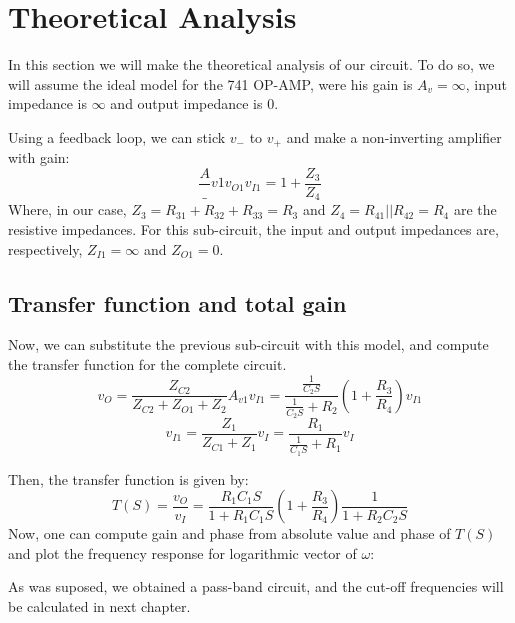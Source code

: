 \section{Theoretical Analysis}
\label{sec:analysis}

\par In this section we will make the theoretical analysis of our circuit. To do so, we will assume the ideal model for the 741 OP-AMP, were his gain is $A_v=\infty$, input impedance is $\infty$ and output impedance is $0$.

\par Using a feedback loop, we can stick $v_-$ to $v_+$ and make a non-inverting amplifier with gain: 
\begin{equation}
\frac A_{v1}{v_{O1}}{v_{I1}}=1+\frac{Z_3}{Z_4}
\end{equation}
Where, in our case, $Z_3=R_{31}+R_{32}+R_{33}=R_3$ and $Z_4=R_{41}||R_{42}=R_4$ are the resistive impedances. For this sub-circuit, the input and output impedances are, respectively, $Z_{I1}=\infty$ and $Z_{O1}=0$. 

\subsection{Transfer function and total gain}

\par Now, we can substitute the previous sub-circuit with this model, and compute the transfer function for the complete circuit. 
\begin{equation}
v_O=\frac{Z_{C2}}{Z_{C2}+Z_{O1}+Z_{2}}A_{v1}v_{I1}=\frac{\frac{1}{C_2S}}{\frac{1}{C_2S}+R_2}(1+\frac{R_3}{R_4})v_{I1}
\end{equation}
\begin{equation}
v_{I1}=\frac{Z_{1}}{Z_{C1}+Z_{1}}v_{I}=\frac{R_1}{\frac{1}{C_1S}+R_1}v_{I}
\end{equation}

Then, the transfer function is given by:
\begin{equation}
T(S)=\frac{v_O}{v_I}=\frac{R_1C_1S}{1+R_1C_1S}(1+\frac{R_3}{R_4})\frac{1}{1+R_2C_2S}
\end{equation}
 Now, one can compute gain and phase from absolute value and phase of $T(S)$ and plot the frequency response for logarithmic vector of $\omega$:
 
 \par As was suposed, we obtained a pass-band circuit, and the cut-off frequencies will be calculated in next chapter.
 
